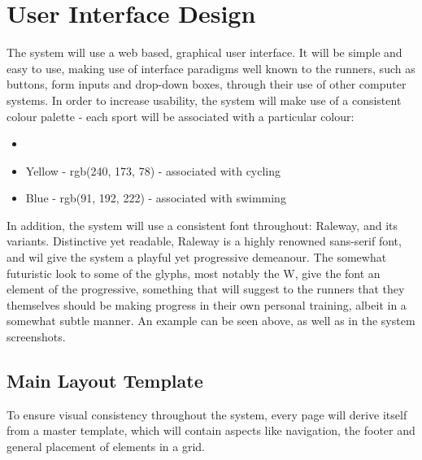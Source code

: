 \documentclass{article}[12pt,a4paper]
\begin{document}
\section{User Interface Design}
The system will use a web based, graphical user interface. It will be simple and easy to use, making use of interface paradigms well known to the runners, such as buttons, form inputs and drop-down boxes, through their use of other computer systems. In order to increase usability, the system will make use of a consistent colour palette - each sport will be associated with a particular colour:\\

\begin{itemize}[label={}]
  \item \raleway{\textcolor{uigreen}{Green - rgb(82, 170, 94) - associated with running}}
  \item \textcolor{uiyellow}{Yellow - rgb(240, 173, 78) - associated with cycling}
  \item \textcolor{uiblue}{Blue - rgb(91, 192, 222) - associated with swimming}\\
\end{itemize}

\noindent
In addition, the system will use a consistent font throughout: Raleway, and its variants. Distinctive yet readable, Raleway is a highly renowned sans-serif font, and wil give the system a playful yet progressive demeanour. The somewhat futuristic look to some of the glyphs, most notably the W, give the font an element of the progressive, something that will suggest to the runners that they themselves should be making progress in their own personal training, albeit in a somewhat subtle manner. An example can be seen above, as well as in the system screenshots.

\subsection{Main Layout Template}
To ensure visual consistency throughout the system, every page will derive itself from a master template, which will contain aspects like navigation, the footer and general placement of elements in a grid.
\end{document}
